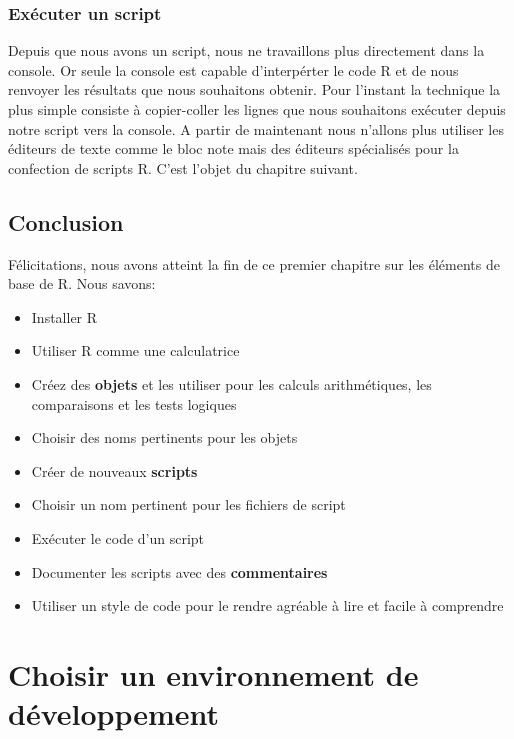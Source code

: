 \documentclass[]{book}
\providecommand{\tightlist}{%
  \setlength{\itemsep}{0pt}\setlength{\parskip}{0pt}}
\begin{document}
\hypertarget{executer-un-script}{%
\subsection{Exécuter un script}\label{executer-un-script}}

Depuis que nous avons un script, nous ne travaillons plus directement dans la console. Or seule la console est capable d'interpérter le code R et de nous renvoyer les résultats que nous souhaitons obtenir. Pour l'instant la technique la plus simple consiste à copier-coller les lignes que nous souhaitons exécuter depuis notre script vers la console. A partir de maintenant nous n'allons plus utiliser les éditeurs de texte comme le bloc note mais des éditeurs spécialisés pour la confection de scripts R. C'est l'objet du chapitre suivant.

\hypertarget{conclusion}{%
\section{Conclusion}\label{conclusion}}

Félicitations, nous avons atteint la fin de ce premier chapitre sur les éléments de base de R. Nous savons:

\begin{itemize}
\tightlist
\item
  Installer R
\item
  Utiliser R comme une calculatrice
\item
  Créez des \textbf{objets} et les utiliser pour les calculs arithmétiques, les comparaisons et les tests logiques
\item
  Choisir des noms pertinents pour les objets
\item
  Créer de nouveaux \textbf{scripts}
\item
  Choisir un nom pertinent pour les fichiers de script
\item
  Exécuter le code d'un script
\item
  Documenter les scripts avec des \textbf{commentaires}
\item
  Utiliser un style de code pour le rendre agréable à lire et facile à comprendre
\end{itemize}

\hypertarget{IDE}{%
\chapter{Choisir un environnement de développement}\label{IDE}}
\end{document}
